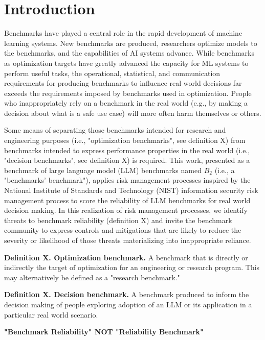 \documentclass{article}
\begin{document}
\section{Introduction}
Benchmarks have played a central role in the rapid development of machine learning systems. New benchmarks are produced, researchers optimize models to the benchmarks, and the capabilities of AI systems advance.\cite{deng2009}\cite{srivastava2022} While benchmarks as optimization targets have greatly advanced the capacity for ML systems to perform useful tasks, the operational, statistical, and communication requirements for producing benchmarks to influence real world decisions far exceeds the requirements imposed by benchmarks used in optimization. People who inappropriately rely on a benchmark in the real world (e.g., by making a decision about what is a safe use case) will more often harm themselves or others.


Some means of separating those benchmarks intended for research and engineering purposes (i.e., "optimization benchmarks", see definition X) from benchmarks intended to express performance properties in the real world (i.e., "decision benchmarks", see definition X) is required. This work, presented as a benchmark of large language model (LLM) benchmarks named \(B_2\) (i.e., a "benchmarks' benchmark"), applies risk management processes inspired by the National Institute of Standards and Technology (NIST) information security risk management process to score the reliability of LLM benchmarks for real world decision making. In this realization of risk management processes, we identify threats to benchmark reliability (definition X) and invite the benchmark community to express controls and mitigations that are likely to reduce the severity or likelihood of those threats materializing into inappropriate reliance.

{\bf Definition X. Optimization benchmark.} A benchmark that is directly or indirectly the target of optimization for an engineering or research program. This may alternatively be defined as a "research benchmark."

{\bf Definition X. Decision benchmark.} A benchmark produced to inform the decision making of people exploring adoption of an LLM or its application in a particular real world scenario.

\begin{center}
    \begin{tcolorbox}[colback=blue!10, colframe=blue!50, width=\textwidth, boxrule=0.5mm, sharp corners, coltext=black, halign=center]
        \bf "Benchmark Reliability" NOT "Reliability Benchmark"
    \end{tcolorbox}
\end{center}
\end{document}
